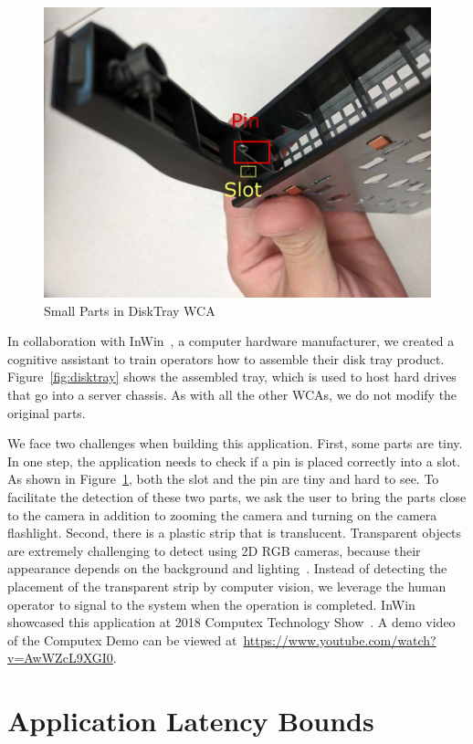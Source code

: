 \begin{figure}
\centering
\includegraphics[width=0.5\linewidth]{FIGS/disktray-challenge.jpg}
\caption{Small Parts in DiskTray WCA}
\label{fig:disktray-challenge}
\end{figure}

In collaboration with InWin~\cite{inwin}, a computer hardware manufacturer, we
created a cognitive assistant to train operators how to assemble their disk
tray product. Figure~\ref{fig:disktray} shows the assembled tray, which is used
to host hard drives that go into a server chassis. As with all the other WCAs,
we do not modify the original parts. 

We face two challenges when building this application. First, some parts are
tiny. In one step, the application needs to check if a pin is placed correctly
into a slot. As shown in Figure~\ref{fig:disktray-challenge}, both the slot and
the pin are tiny and hard to see. To facilitate the detection of these two
parts, we ask the user to bring the parts close to the camera in addition to
zooming the camera and turning on the camera flashlight. Second, there is a
plastic strip that is translucent. Transparent objects are extremely challenging
to detect using 2D RGB cameras, because their appearance depends on the
background and lighting~\cite{lysenkov2013recognition}. Instead of detecting the
placement of the transparent strip by computer vision, we leverage the human
operator to signal to the system when the operation is completed. InWin
showcased this application at 2018 Computex Technology Show~\cite{computex}. A
demo video of the Computex Demo can be viewed
at~\url{https://www.youtube.com/watch?v=AwWZcL9XGI0}.


\section{Application Latency Bounds}

